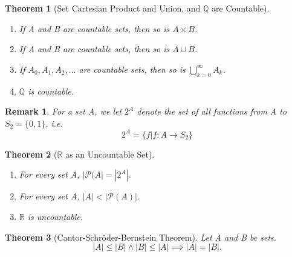 \documentclass[11pt, oneside]{book}
\theoremstyle{break}
\newtheorem{thm}{Theorem}[section]
\newtheorem*{remark}{Remark}
\newcommand{\bb}[1]{\mathbb{#1}}		%
\begin{document}
\begin{thm}[Set Cartesian Product and Union, and $\bb{Q}$ are Countable]
	\begin{enumerate}
		\item If A and B are countable sets, then so is $A \times B$.
		\item If A and B are countable sets, then so is $A \cup B$.
		\item If $A_0, A_1, A_2, ...$ are countable sets, then so is $\bigcup_{k = 0}^{\infty} A_k$.
		\item $\bb{Q}$ is countable.
	\end{enumerate}
\end{thm}

\begin{remark}
	For a set A, we let $2^A$ denote the set of all functions from A to $S_2 = \{0, 1\}$, i.e.
	\[
		2^A = \{f | f: A \to S_2 \}
	\]
\end{remark}

\begin{thm}[$\bb{R}$ as an Uncountable Set]
	\begin{enumerate}
		\item For every set A, $|\mathcal{P}(A| = |2^A|$.
		\item For every set A, $|A| < |\mathcal{P}(A)|$.
		\item $\bb{R}$ is uncountable.
	\end{enumerate}
\end{thm}

\begin{thm}[Cantor-Schröder-Bernstein Theorem]
	Let A and B be sets.
	\[
		|A| \leq |B| \land |B| \leq |A| \implies |A| = |B|.
	\]
\end{thm}
\end{document}
